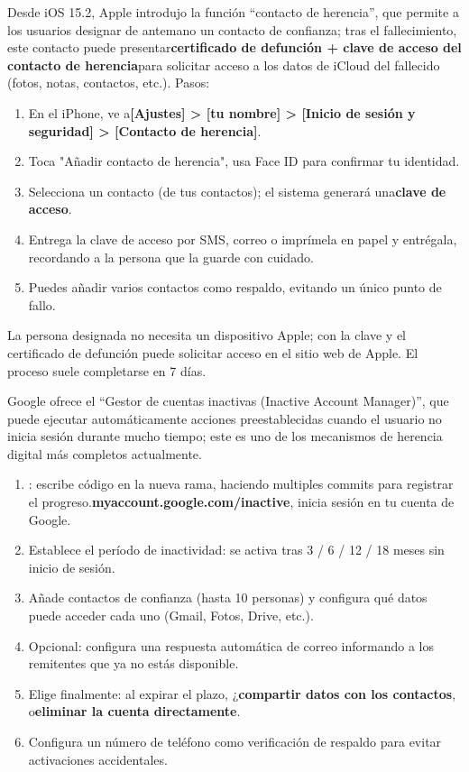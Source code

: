 
Desde iOS 15.2, Apple introdujo la función “contacto de herencia”, que permite a los usuarios designar de antemano un contacto de confianza; tras el fallecimiento, este contacto puede presentar\textbf{certificado de defunción + clave de acceso del contacto de herencia}para solicitar acceso a los datos de iCloud del fallecido (fotos, notas, contactos, etc.). Pasos:

\begin{enumerate}
  \item En el iPhone, ve a\textbf{[Ajustes] > [tu nombre] > [Inicio de sesión y seguridad] > [Contacto de herencia]}.
  \item Toca "Añadir contacto de herencia", usa Face ID para confirmar tu identidad.
  \item Selecciona un contacto (de tus contactos); el sistema generará una\textbf{clave de acceso}.
  \item Entrega la clave de acceso por SMS, correo o imprímela en papel y entrégala, recordando a la persona que la guarde con cuidado.
  \item Puedes añadir varios contactos como respaldo, evitando un único punto de fallo.
\end{enumerate}

La persona designada no necesita un dispositivo Apple; con la clave y el certificado de defunción puede solicitar acceso en el sitio web de Apple. El proceso suele completarse en 7 días.


Google ofrece el “Gestor de cuentas inactivas (Inactive Account Manager)”, que puede ejecutar automáticamente acciones preestablecidas cuando el usuario no inicia sesión durante mucho tiempo; este es uno de los mecanismos de herencia digital más completos actualmente.

\begin{enumerate}
  \item : escribe código en la nueva rama, haciendo multiples commits para registrar el progreso.\textbf{myaccount.google.com/inactive}, inicia sesión en tu cuenta de Google.
  \item Establece el período de inactividad: se activa tras 3 / 6 / 12 / 18 meses sin inicio de sesión.
  \item Añade contactos de confianza (hasta 10 personas) y configura qué datos puede acceder cada uno (Gmail, Fotos, Drive, etc.).
  \item Opcional: configura una respuesta automática de correo informando a los remitentes que ya no estás disponible.
  \item Elige finalmente: al expirar el plazo, ¿\textbf{compartir datos con los contactos}, o\textbf{eliminar la cuenta directamente}.
  \item Configura un número de teléfono como verificación de respaldo para evitar activaciones accidentales.
\end{enumerate}

